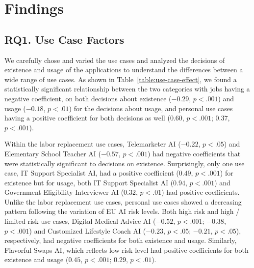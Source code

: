 \section{Findings}

% 


\subsection{RQ1. Use Case Factors}
We carefully chose and varied the use cases and analyzed the decisions of existence and usage of the applications to understand the differences between a wide range of use cases. As shown in Table~\ref{table:use-case-effect}, we found a statistically significant relationship between the two categories with jobs having a negative coefficient, on both decisions about existence ($-0.29$, $p<.001$) and usage ($-0.18$, $p<.01$) for the decisions about usage, and personal use cases having a positive coefficient for both decisions as well ($0.60$, $p<.001$; $0.37$, $p<.001$). 

Within the labor replacement use cases, Telemarketer AI ($-0.22$, $p<.05$) and Elementary School Teacher AI ($-0.57$, $p<.001$) had negative coefficients that were statistically significant to decisions on existence. Surprisingly, only one use case, IT Support Specialist AI, had a positive coefficient ($0.49$, $p<.001$) for existence but for usage, both IT Support Specialist AI ($0.94$, $p<.001$) and Government Eligibility Interviewer AI ($0.32$, $p<.01$) had positive coefficients. Unlike the labor replacement use cases, personal use cases showed a decreasing pattern following the variation of EU AI risk levels. Both high risk and high / limited risk use cases, Digital Medical Advice AI ($-0.52$, $p<.001$; $-0.38$, $p<.001$) and Customized Lifestyle Coach AI ($-0.23$, $p<.05$; $-0.21$, $p<.05$), respectively, had negative coefficients for both existence and usage. Similarly, Flavorful Swaps AI, which reflects low risk level had positive coefficients for both existence and usage ($0.45$, $p<.001$; $0.29$, $p<.01$). 

